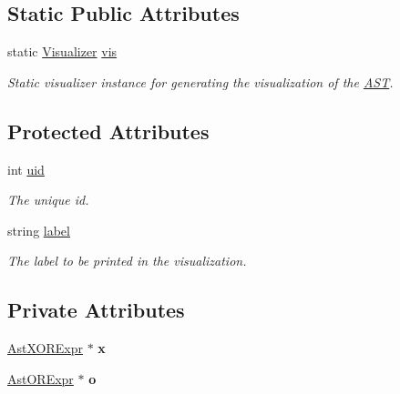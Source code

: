 \subsection*{Static Public Attributes}
\begin{DoxyCompactItemize}
\item 
\hypertarget{classAST_aca9e6637209b31e03a09c0d42f29bdfa}{static \hyperlink{classVisualizer}{Visualizer} \hyperlink{classAST_aca9e6637209b31e03a09c0d42f29bdfa}{vis}}\label{classAST_aca9e6637209b31e03a09c0d42f29bdfa}

\begin{DoxyCompactList}\small\item\em Static visualizer instance for generating the visualization of the \hyperlink{classAST}{A\-S\-T}. \end{DoxyCompactList}\end{DoxyCompactItemize}
\subsection*{Protected Attributes}
\begin{DoxyCompactItemize}
\item 
\hypertarget{classAST_a847b778f1c3dd5a19de32de432ee6e15}{int \hyperlink{classAST_a847b778f1c3dd5a19de32de432ee6e15}{uid}}\label{classAST_a847b778f1c3dd5a19de32de432ee6e15}

\begin{DoxyCompactList}\small\item\em The unique id. \end{DoxyCompactList}\item 
\hypertarget{classAST_ab2e239ccc0688d2341724432ff5a1a31}{string \hyperlink{classAST_ab2e239ccc0688d2341724432ff5a1a31}{label}}\label{classAST_ab2e239ccc0688d2341724432ff5a1a31}

\begin{DoxyCompactList}\small\item\em The label to be printed in the visualization. \end{DoxyCompactList}\end{DoxyCompactItemize}
\subsection*{Private Attributes}
\begin{DoxyCompactItemize}
\item 
\hypertarget{classAstORExpr_a48febfda9238b0c72ba8193a6cdb3b91}{\hyperlink{classAstXORExpr}{Ast\-X\-O\-R\-Expr} $\ast$ {\bfseries x}}\label{classAstORExpr_a48febfda9238b0c72ba8193a6cdb3b91}

\item 
\hypertarget{classAstORExpr_a1ba5315c8b880fe7c658cb458cd9c54c}{\hyperlink{classAstORExpr}{Ast\-O\-R\-Expr} $\ast$ {\bfseries o}}\label{classAstORExpr_a1ba5315c8b880fe7c658cb458cd9c54c}

\end{DoxyCompactItemize}



